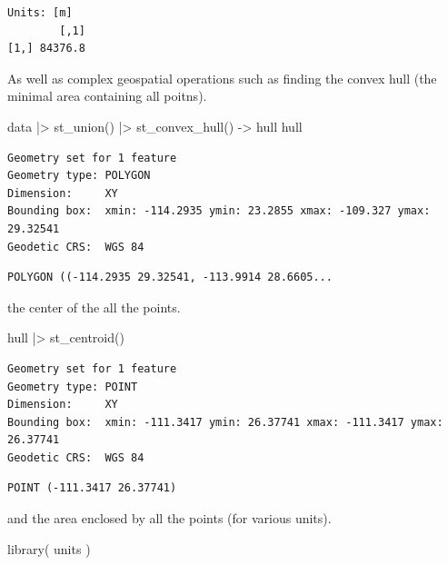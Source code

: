 \documentclass[
  letterpaper,
]{book}
\newenvironment{Shaded}{\begin{snugshade}}{\end{snugshade}}
\newcommand{\FunctionTok}[1]{\textcolor[rgb]{0.28,0.35,0.67}{#1}}
\newcommand{\NormalTok}[1]{\textcolor[rgb]{0.00,0.23,0.31}{#1}}
\newcommand{\OtherTok}[1]{\textcolor[rgb]{0.00,0.23,0.31}{#1}}
\newcommand{\SpecialCharTok}[1]{\textcolor[rgb]{0.37,0.37,0.37}{#1}}
\begin{document}
\begin{verbatim}
Units: [m]
        [,1]
[1,] 84376.8
\end{verbatim}

As well as complex geospatial operations such as finding the convex hull
(the minimal area containing all poitns).

\begin{Shaded}
\begin{Highlighting}[]
\NormalTok{data }\SpecialCharTok{|\textgreater{}}
  \FunctionTok{st\_union}\NormalTok{() }\SpecialCharTok{|\textgreater{}}
  \FunctionTok{st\_convex\_hull}\NormalTok{() }\OtherTok{{-}\textgreater{}}\NormalTok{ hull}
\NormalTok{hull}
\end{Highlighting}
\end{Shaded}

\begin{verbatim}
Geometry set for 1 feature 
Geometry type: POLYGON
Dimension:     XY
Bounding box:  xmin: -114.2935 ymin: 23.2855 xmax: -109.327 ymax: 29.32541
Geodetic CRS:  WGS 84
\end{verbatim}

\begin{verbatim}
POLYGON ((-114.2935 29.32541, -113.9914 28.6605...
\end{verbatim}

the center of the all the points.

\begin{Shaded}
\begin{Highlighting}[]
\NormalTok{hull }\SpecialCharTok{|\textgreater{}}
  \FunctionTok{st\_centroid}\NormalTok{()}
\end{Highlighting}
\end{Shaded}

\begin{verbatim}
Geometry set for 1 feature 
Geometry type: POINT
Dimension:     XY
Bounding box:  xmin: -111.3417 ymin: 26.37741 xmax: -111.3417 ymax: 26.37741
Geodetic CRS:  WGS 84
\end{verbatim}

\begin{verbatim}
POINT (-111.3417 26.37741)
\end{verbatim}

and the area enclosed by all the points (for various units).

\begin{Shaded}
\begin{Highlighting}[]
\FunctionTok{library}\NormalTok{( units )}
\end{Highlighting}
\end{Shaded}
\end{document}
